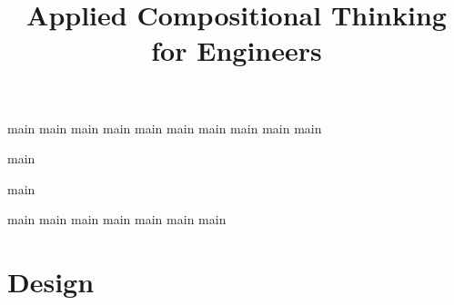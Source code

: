 \pagestyle{scrheadings}

\ohead{\pagemark}
\ihead{\headmark}
\cfoot{}
\dominitoc
\doparttoc
\setcounter{parttocdepth}{0}
\setcounter{minitocdepth}{1}

\title{Applied Compositional Thinking\\ for Engineers}
\date{}





\setcounter{tocdepth}{1}



\tableofcontents


{main}
{main}
{main}
{main}
{main}
{main}
{main}
{main}
{main}
{main}

{main}

{main}

{main}
{main}
{main}
{main}
{main}
{main}
{main}


\part{Design}\label{part:co-design}

